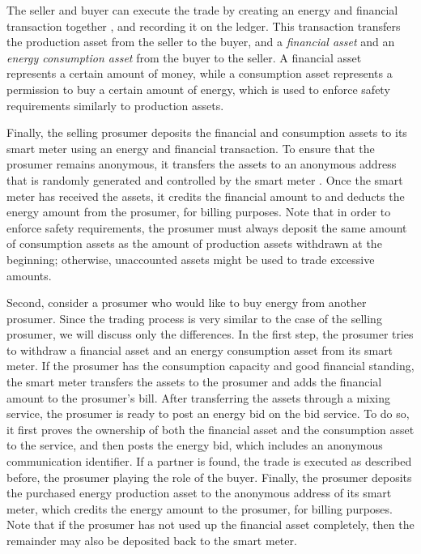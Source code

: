The seller and buyer can execute the trade by creating an energy and financial transaction together , and recording it on the ledger.
This transaction transfers the production asset from the seller to the buyer, and a \emph{financial asset} and an \emph{energy consumption asset} from the buyer to the seller.
A financial asset represents a certain amount of money, while a consumption asset represents a permission to buy a certain amount of energy, which is used to enforce safety requirements similarly to production assets.

Finally, the selling prosumer deposits the financial and consumption assets to its smart meter using an energy and financial transaction.
To ensure that the prosumer remains anonymous, it transfers the assets to an anonymous address that is randomly generated and controlled by the smart meter .
Once the smart meter has received the assets, it credits the financial amount to and deducts the energy amount from the prosumer, for billing purposes.
Note that in order to enforce safety requirements, the prosumer must always deposit the same amount of consumption assets as the amount of production assets withdrawn at the beginning; otherwise, unaccounted assets might be used to trade excessive amounts.

Second, consider a prosumer who would like to buy energy from another prosumer.
Since the trading process is very similar to the case of the selling prosumer, we will discuss only the differences.
In the first step, the prosumer tries to withdraw a financial asset and an energy consumption asset from its smart meter.
If the prosumer has the consumption capacity and good financial standing, the smart meter transfers the assets to the prosumer and adds the financial amount to the prosumer's bill.
After transferring the assets through a mixing service, the prosumer is ready to post an energy bid on the bid service.
To do so, it first proves the ownership of both the financial asset and the consumption asset to the service, and then posts the energy bid, which includes an anonymous communication identifier.
If a partner is found, the trade is executed as described before, the prosumer playing the role of the buyer.
Finally, the prosumer deposits the purchased energy production asset to the anonymous address of its smart meter,
which credits the energy amount to the prosumer, for billing purposes.
Note that if the prosumer has not used up the financial asset completely, then the remainder may also be deposited back to the smart meter.





